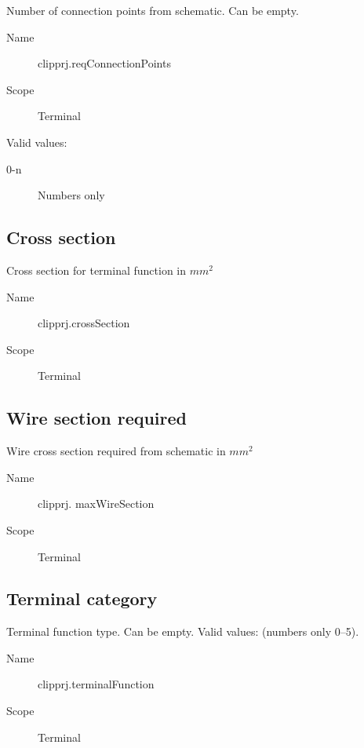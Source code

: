 \documentclass[%
	a4paper,
	oneside,
	listof=numbered,
	parskip=half,
	headsepline=true,
	footsepline=false,
	normalheadings,
	0.7headlines,
	headexclude,
	]{scrbook}
\begin{document}
Number of connection points from schematic.
Can be empty.\\

\begin{description}
	\item[Name] clipprj.reqConnectionPoints
	\item[Scope] Terminal
\end{description}

Valid values:

\begin{description}
	\item[0-n] Numbers only
\end{description}

\subsection{Cross section}

Cross section for terminal function in $mm^2$

\begin{description}
	\item[Name] clipprj.crossSection
	\item[Scope] Terminal
\end{description}

\subsection{Wire section required}

Wire cross section required from schematic in $mm^2$

\begin{description}
	\item[Name] clipprj.
	maxWireSection
	\item[Scope] Terminal
\end{description}

\subsection{Terminal category}

Terminal function type.
Can be empty.
Valid values: (numbers only 0--5).

\begin{description}
	\item[Name] clipprj.terminalFunction
	\item[Scope] Terminal
\end{description}
\end{document}
